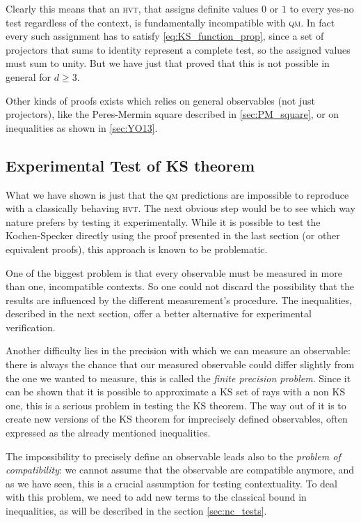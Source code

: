 \documentclass[a4paper]{article}
\newcommand{\acron}[1]{\textsc{#1}}
\newcommand{\HVT}{\acron{hvt}}
\newcommand{\QM}{\acron{qm}}
\theoremstyle{definition}
\begin{document}
Clearly this means that an \HVT{}, that assigns definite values $0$ or $1$ to every
yes-no test regardless of the context, is fundamentally incompatible with \QM{}.
In fact every such assignment has to satisfy \eqref{eq:KS_function_prop}, since a
set of projectors that sums to identity represent a complete test, so the
assigned values must sum to unity.
But we have just that proved that this is not possible in general for $d \ge 3$.

Other kinds of proofs exists which relies on general observables (not just
projectors), like the Peres-Mermin square described in \ref{sec:PM_square}, or
on inequalities as shown in \ref{sec:YO13}.

\subsection{Experimental Test of KS theorem}
\label{sec:exp_KS}
What we have shown is just that the \QM{} predictions are impossible to reproduce
with a classically behaving \HVT{}.
The next obvious step would be to see which way nature prefers by testing it
experimentally.
While it is possible to test the Kochen-Specker directly using the proof presented
in the last section (or other equivalent proofs), this approach is known to be
problematic.

One of the biggest problem is that every observable must be measured in more
than one, incompatible contexts. So one could not discard the possibility that
the results are influenced by the different measurement's procedure.
The inequalities, described in the next section, offer a better alternative for
experimental verification.

Another difficulty lies in the precision with which we can measure an
observable: there is always the chance that our measured observable could
differ slightly from the one we wanted to measure, this is called the \emph{finite
precision problem}.
Since it can be shown that it is possible to approximate a \acron{KS} set of rays with a
non \acron{KS} one, this is a serious problem in testing the \acron{KS}
theorem.
The way out of it is to create new versions of the \acron{KS} theorem
for imprecisely defined observables, often expressed as the already mentioned
inequalities.

The impossibility to precisely define an observable leads also to the
\emph{problem of compatibility}: we cannot assume that the observable are
compatible anymore, and as we have seen, this is a crucial assumption for
testing contextuality.
To deal with this problem, we need to add new terms to the classical bound in
inequalities, as will be described in the section \ref{sec:nc_tests}.
\end{document}
